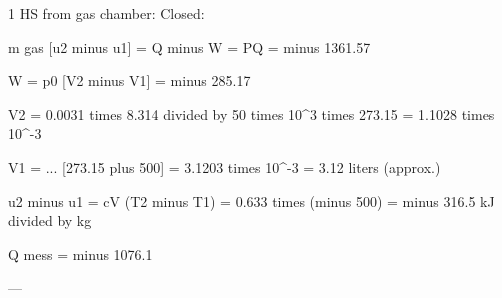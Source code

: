 1 HS from gas chamber:  
Closed:  

m gas [u2 minus u1] = Q minus W = PQ = minus 1361.57  

W = p0 [V2 minus V1] = minus 285.17  

V2 = 0.0031 times 8.314 divided by 50 times 10^3 times 273.15 = 1.1028 times 10^-3  

V1 = ... [273.15 plus 500] = 3.1203 times 10^-3 = 3.12 liters (approx.)  

u2 minus u1 = cV (T2 minus T1) = 0.633 times (minus 500) = minus 316.5 kJ divided by kg  

Q mess = minus 1076.1  

---